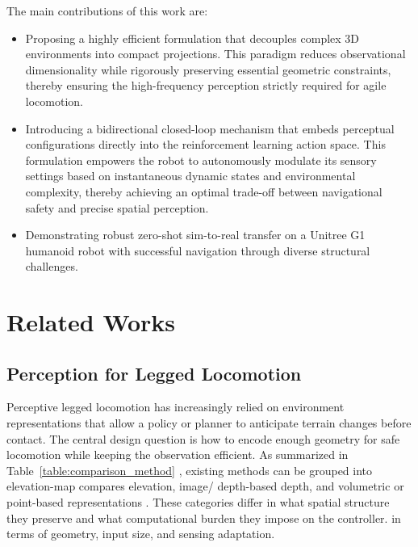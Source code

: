 \documentclass[letterpaper, 10 pt, conference]{ieeeconf/ieeeconf}
\providecommand{\DIFadd}[1]{{\protect\color{blue} \sf #1}} %
\providecommand{\DIFdel}[1]{{\protect\color{red} \scriptsize #1}} %
\providecommand{\DIFaddbegin}{} %
\providecommand{\DIFaddend}{} %
\providecommand{\DIFdelbegin}{} %
\providecommand{\DIFdelend}{} %
\begin{document}
The main contributions of this work are:
\begin{itemize}
    \item Proposing a highly efficient formulation that decouples complex 3D environments into compact projections. This paradigm reduces observational dimensionality while rigorously preserving essential geometric constraints, thereby ensuring the high-frequency perception strictly required for agile locomotion.
    \item Introducing a bidirectional closed-loop mechanism that embeds perceptual configurations directly into the reinforcement learning action space. This formulation empowers the robot to autonomously modulate its sensory settings based on instantaneous dynamic states and environmental complexity, thereby achieving an optimal trade-off between navigational safety and precise spatial perception.
    \item Demonstrating robust zero-shot sim-to-real transfer on a Unitree G1 humanoid robot with successful navigation through diverse structural challenges.
\end{itemize}

\section{Related Works}
\subsection{Perception for Legged Locomotion}
\label{sec:RELATED WORKS}
\DIFdelbegin \DIFdel{Perceptive legged locomotion has increasingly relied on environment representations that allow a policy or planner to anticipate terrain changes before contact. The central design question is how to encode enough geometry for safe locomotion while keeping the observation efficient.
As summarized in }\DIFdelend Table~\ref{table:comparison_method} \DIFdelbegin \DIFdel{, existing methods can be grouped into elevation-map}\DIFdelend \DIFaddbegin \DIFadd{compares elevation}\DIFaddend , image/\DIFdelbegin \DIFdel{depth-based}\DIFdelend \DIFaddbegin \DIFadd{depth}\DIFaddend , and volumetric or point-based representations \DIFdelbegin \DIFdel{. These categories differ in what spatial structure they preserve and what computational burden they impose on the controller.
}\DIFdelend \DIFaddbegin \DIFadd{in terms of geometry, input size, and sensing adaptation.
}
\end{document}

